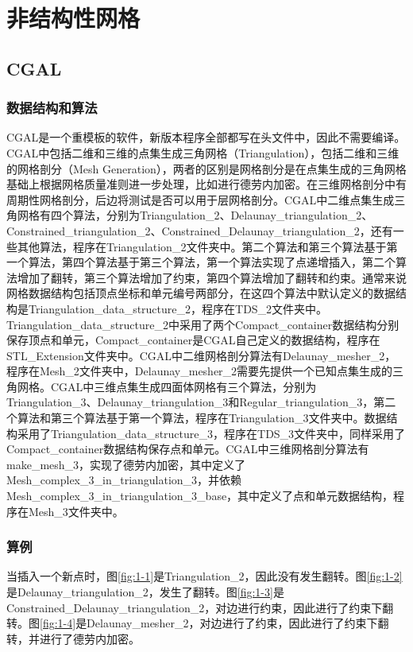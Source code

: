\section{非结构性网格}

\subsection{CGAL}

\subsubsection{数据结构和算法}
CGAL是一个重模板的软件，新版本程序全部都写在头文件中，因此不需要编译。CGAL中包括二维和三维的点集生成三角网格（Triangulation），包括二维和三维的网格剖分（Mesh Generation），两者的区别是网格剖分是在点集生成的三角网格基础上根据网格质量准则进一步处理，比如进行德劳内加密。在三维网格剖分中有周期性网格剖分，后边将测试是否可以用于层网格剖分。CGAL中二维点集生成三角网格有四个算法，分别为Triangulation\_2、Delaunay\_triangulation\_2、Constrained\_triangulation\_2、Constrained\_Delaunay\_triangulation\_2，还有一些其他算法，程序在Triangulation\_2文件夹中。第二个算法和第三个算法基于第一个算法，第四个算法基于第三个算法，第一个算法实现了点递增插入，第二个算法增加了翻转，第三个算法增加了约束，第四个算法增加了翻转和约束。通常来说网格数据结构包括顶点坐标和单元编号两部分，在这四个算法中默认定义的数据结构是Triangulation\_data\_structure\_2，程序在TDS\_2文件夹中。Triangulation\_data\_structure\_2中采用了两个Compact\_container数据结构分别保存顶点和单元，Compact\_container是CGAL自己定义的数据结构，程序在STL\_Extension文件夹中。CGAL中二维网格剖分算法有Delaunay\_mesher\_2，程序在Mesh\_2文件夹中，Delaunay\_mesher\_2需要先提供一个已知点集生成的三角网格。CGAL中三维点集生成四面体网格有三个算法，分别为Triangulation\_3、Delaunay\_triangulation\_3和Regular\_triangulation\_3，第二个算法和第三个算法基于第一个算法，程序在Triangulation\_3文件夹中。数据结构采用了Triangulation\_data\_structure\_3，程序在TDS\_3文件夹中，同样采用了Compact\_container数据结构保存点和单元。CGAL中三维网格剖分算法有make\_mesh\_3，实现了德劳内加密，其中定义了Mesh\_complex\_3\_in\_triangulation\_3，并依赖Mesh\_complex\_3\_in\_triangulation\_3\_base，其中定义了点和单元数据结构，程序在Mesh\_3文件夹中。

\subsubsection{算例}
当插入一个新点时，图\ref{fig:1-1}是Triangulation\_2，因此没有发生翻转。图\ref{fig:1-2}是Delaunay\_triangulation\_2，发生了翻转。图\ref{fig:1-3}是Constrained\_Delaunay\_triangulation\_2，对边进行约束，因此进行了约束下翻转。图\ref{fig:1-4}是Delaunay\_mesher\_2，对边进行了约束，因此进行了约束下翻转，并进行了德劳内加密。

